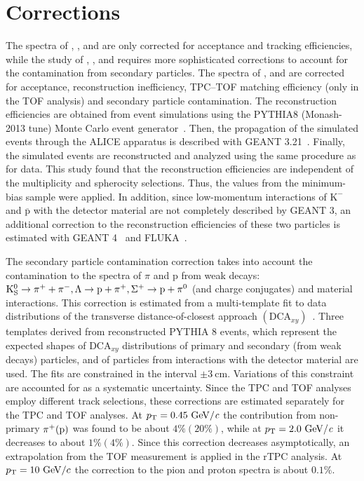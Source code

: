 \section{Corrections}\label{Sec:Corr}

The \pt spectra of \PHI, \KSTAR, and \XI are only corrected for acceptance and tracking efficiencies, while the study of \pikp, \LA, and \kzero requires more sophisticated corrections to account for the contamination from secondary particles. The \pt spectra of \pion, \kaon and \pr are corrected for acceptance, reconstruction inefficiency, TPC--TOF matching efficiency (only in the TOF analysis) and secondary particle contamination. The reconstruction efficiencies are obtained from event simulations using the PYTHIA8 (Monash-2013 tune) Monte Carlo event generator~\cite{pythia8}. Then, the propagation of the simulated events through the ALICE apparatus is described with GEANT 3.21~\cite{Geant3}. Finally, the simulated events are reconstructed and analyzed using the same procedure as for data. This study found that the reconstruction efficiencies are independent of the multiplicity and spherocity selections. Thus, the values from the minimum-bias sample were applied. In addition, since low-momentum interactions of $\mathrm{K}^{-}$ and $\mathrm{\overline{p}}$ with the detector material are not completely described by GEANT 3, an additional correction to the reconstruction efficiencies of these two particles is estimated with GEANT 4~\cite{Geant4} and FLUKA~\cite{Fluka}. 

The secondary particle contamination correction takes into account the contamination to the \pt spectra of $\pi$ and $\mathrm{p}$ from weak decays: ${\rm K}^{0}_{\rm{S}} \rightarrow \pi^{+}+\pi^{-}, \Lambda \rightarrow \mathrm{p}+\pi^{+},  \Sigma^{+} \rightarrow \mathrm{p}+\pi^{0}$ (and charge conjugates) and material interactions. This correction is estimated from a multi-template fit to data distributions of the transverse distance-of-closest
approach $(\mathrm{DCA}_{xy})$~\cite{piKp_PbPb_276}. Three templates derived from reconstructed PYTHIA 8 events, which represent the expected shapes of
$\mathrm{DCA}_{xy}$ distributions of primary and secondary (from weak decays) particles, and of particles from interactions with the detector material are used. The fits are constrained in the interval $\pm 3~\mathrm{cm}$. Variations of this constraint are accounted for as a systematic uncertainty. Since the TPC and TOF analyses employ different track selections, these corrections are estimated separately for the TPC and TOF analyses. At $p_{\rm T} = 0.45 ~\rm{GeV}/\it{c}$ the contribution from non-primary $\pi^{+} (\rm{p})$ was found to be about $4\% (20\%)$, while at $p_{\rm T} = 2.0 ~\rm{GeV}/\it{c}$ it decreases to about $1\% (4\%)$. Since this correction decreases asymptotically, an extrapolation from the TOF measurement is applied in the rTPC analysis. At $p_{\rm T}=10~\mathrm{GeV}/c$ the correction to the pion and proton spectra is about $0.1\%$.
 
